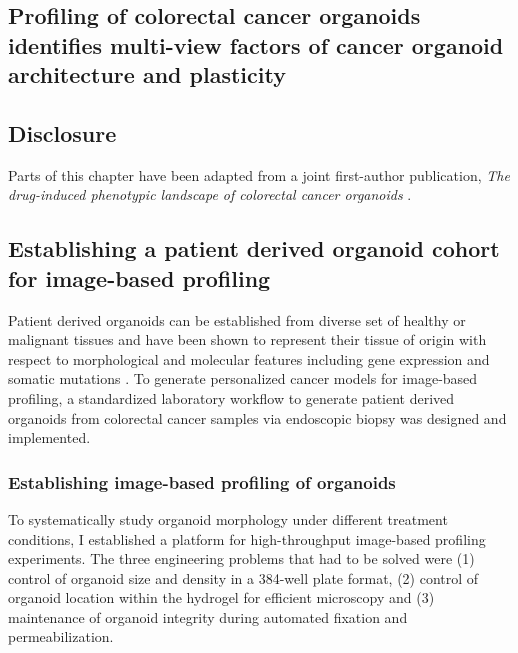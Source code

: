 \begin{flushleft}
\chapter{Profiling of colorectal cancer organoids identifies multi-view factors of cancer organoid architecture and plasticity}


\section{Disclosure}
Parts of this chapter have been adapted from a joint first-author publication, \textit{The drug-induced phenotypic landscape of colorectal cancer organoids} \parencite{betgeDruginducedPhenotypicLandscape2022}. 

\section{Establishing a patient derived organoid cohort for image-based profiling}

Patient derived organoids can be established from diverse set of healthy or malignant tissues and have been shown to represent their tissue of origin with respect to morphological and molecular features including gene expression and somatic mutations \parencite{Fujii2016-ax, vandeweteringProspectiveDerivationLiving2015, satoLongtermExpansionEpithelial2011}. To generate personalized cancer models for image-based profiling, a standardized laboratory workflow to generate patient derived organoids from colorectal cancer samples via endoscopic biopsy was designed and implemented. 

\subsection{Establishing image-based profiling of organoids}
To systematically study organoid morphology under different treatment conditions, I established a platform for high-throughput image-based profiling experiments. The three engineering problems that had to be solved were (1) control of organoid size and density in a 384-well plate format, (2) control of organoid location within the hydrogel for efficient microscopy and (3) maintenance of organoid integrity during automated fixation and permeabilization. 



\end{flushleft}
